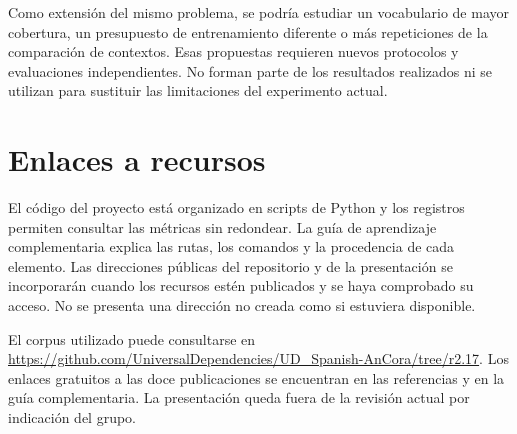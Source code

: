 Como extensión del mismo problema, se podría estudiar un vocabulario de mayor cobertura, un presupuesto de entrenamiento diferente o más repeticiones de la comparación de contextos. Esas propuestas requieren nuevos protocolos y evaluaciones independientes. No forman parte de los resultados realizados ni se utilizan para sustituir las limitaciones del experimento actual.

\section{Enlaces a recursos}
El código del proyecto está organizado en scripts de Python y los registros permiten consultar las métricas sin redondear. La guía de aprendizaje complementaria explica las rutas, los comandos y la procedencia de cada elemento. Las direcciones públicas del repositorio y de la presentación se incorporarán cuando los recursos estén publicados y se haya comprobado su acceso. No se presenta una dirección no creada como si estuviera disponible.

El corpus utilizado puede consultarse en
\url{https://github.com/UniversalDependencies/UD_Spanish-AnCora/tree/r2.17}.
Los enlaces gratuitos a las doce publicaciones se encuentran en las referencias y en la guía complementaria. La presentación queda fuera de la revisión actual por indicación del grupo.

